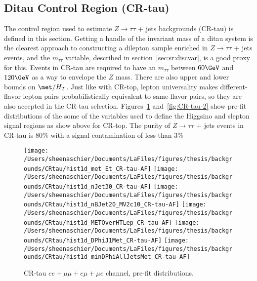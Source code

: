 \subsection{Ditau Control Region (CR-tau)}
The control region used to estimate $Z\rightarrow\tau\tau$ + jets backgrounds (CR-tau) is defined in this section.  Getting a handle of the invariant mass of a ditau system is the clearest approach to constructing a dilepton sample enriched in $Z\rightarrow\tau\tau$ + jets events, and the $m_{\tau\tau}$ variable, described in section~\ref{sec:sr:discvar}, is a good proxy for this.  Events in CR-tau are required to have an $m_{\tau\tau}$ between $60 \GeV$ and $120 \GeV$ as a way to envelope the $Z$ mass.  There are also upper and lower bounds on $\met/H_T$.  Just like with CR-top, lepton universality makes different-flavor lepton pairs probabilistically equivalent to same-flavor pairs, so they are also accepted in the CR-tau selection.  Figures~\ref{fig:CR-tau-1} and~\ref{fig:CR-tau-2} show pre-fit distributions of the some of the variables used to define the Higgsino and slepton signal regions as show above for CR-top.  The purity of $Z\rightarrow\tau\tau$ + jets events in CR-tau is $80\%$ with a signal contamination of less than $3\%$
\begin{figure}
    \centering
        \texttt{[image: /Users/sheenaschier/Documents/LaFiles/figures/thesis/backgrounds/CRtau/hist1d\_met\_Et\_CR-tau-AF]}
        \texttt{[image: /Users/sheenaschier/Documents/LaFiles/figures/thesis/backgrounds/CRtau/hist1d\_nJet30\_CR-tau-AF]}
        \texttt{[image: /Users/sheenaschier/Documents/LaFiles/figures/thesis/backgrounds/CRtau/hist1d\_nBJet20\_MV2c10\_CR-tau-AF]}
        \texttt{[image: /Users/sheenaschier/Documents/LaFiles/figures/thesis/backgrounds/CRtau/hist1d\_METOverHTLep\_CR-tau-AF]}
        \texttt{[image: /Users/sheenaschier/Documents/LaFiles/figures/thesis/backgrounds/CRtau/hist1d\_DPhiJ1Met\_CR-tau-AF]}
        \texttt{[image: /Users/sheenaschier/Documents/LaFiles/figures/thesis/backgrounds/CRtau/hist1d\_minDPhiAllJetsMet\_CR-tau-AF]}
    \caption{CR-tau $ee+\mu\mu +e\mu + \mu e$ channel, pre-fit distributions.}
    \label{fig:CR-tau-1}
\end{figure} 

